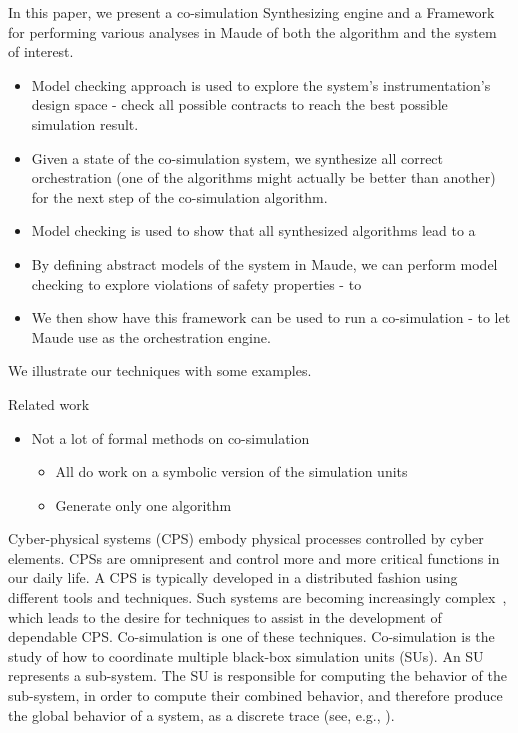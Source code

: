   In this paper, we present a co-simulation Synthesizing engine and a Framework for performing various analyses in Maude of both the algorithm and the system of interest.
  \begin{itemize}
    \item Model checking approach is used to explore the system's instrumentation's design space - check all possible contracts to reach the best possible simulation result.
    \item Given a state of the co-simulation system, we synthesize all correct orchestration (one of the algorithms might actually be better than another) for the next step of the co-simulation algorithm.
    \item Model checking is used to show that all synthesized algorithms lead to a  
    \item By defining abstract models of the system in Maude, we can perform model checking to explore violations of safety properties - to 
    \item We then show have this framework can be used to run a co-simulation - to let Maude use as the orchestration engine.
  \end{itemize}
  
  We illustrate our techniques with some examples.
  
  Related work
  \begin{itemize}
    \item Not a lot of formal methods on co-simulation
    \begin{itemize}
      \item All do work on a symbolic version of the simulation units
      \item Generate only one algorithm
    \end{itemize}
  \end{itemize}

Cyber-physical systems (CPS) embody physical processes controlled by cyber elements. 
CPSs are omnipresent and control more and more critical functions in our daily life.
A CPS is typically developed in a distributed fashion using different tools and techniques. 
Such systems are becoming increasingly complex~\cite{4519604}, which leads to the desire for techniques to assist in the development of dependable CPS.
Co-simulation is one of these techniques. Co-simulation is the study of how to coordinate multiple black-box simulation units (SUs).
An SU represents a sub-system. 
The SU is responsible for computing the behavior of the sub-system, in order to compute their combined behavior, and therefore produce the global behavior of a system, as a discrete trace (see, e.g., \cite{Kubler2000,Gomes2018}).



